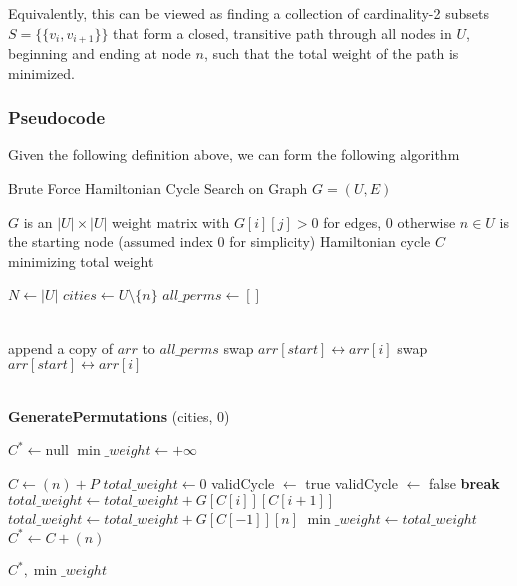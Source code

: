 Equivalently, this can be viewed as finding a collection of cardinality-2 subsets \( S = \{ \{v_i, v_{i+1}\} \} \) that form a closed, transitive path through all nodes in \( U \), beginning and ending at node \( n \), such that the total weight of the path is minimized.


\subsubsection{Pseudocode}
Given the following definition above, we can form the following algorithm

\begin{algorithm}[H]
    \caption{Brute Force Hamiltonian Cycle Search on Graph $G = (U, E)$}
    \begin{algorithmic}
    \Require{} $G$ is an $|U| \times |U|$ weight matrix with $G[i][j] > 0$ for edges, 0 otherwise
    \Require{} $n \in U$ is the starting node (assumed index 0 for simplicity)
    \Ensure{} Hamiltonian cycle $C$ minimizing total weight
    
    \State{} $N \gets |U|$
    \State{} $cities \gets U \setminus \{n\}$ 
    \State{} $all\_perms \gets []$
    
    \\
            \State{} append a copy of $arr$ to $all\_perms$
            \State{} \Return{}
        \EndIf{}
            \State{} swap $arr[start] \leftrightarrow arr[i]$
            \State{} 
            \State{} swap $arr[start] \leftrightarrow arr[i]$ 
        \EndFor{}
    \EndProcedure{}
    
    \\
    \State{} \textbf{GeneratePermutations} (cities, 0)
    
    \State{} $C^{*} \gets \text{null}$
    \State{} $\min\_weight \gets +\infty$
    
        \State{} $C \gets (n) + P$ 
        \State{} $total\_weight \gets 0$
        \State{} validCycle $\gets$ true
             
                \State{} validCycle $\gets$ false
                \State{} \textbf{break}
            \Else{}
                \State{} $total\_weight \gets total\_weight + G[C[i]][C[i+1]]$
            \EndIf{}
        \EndFor{}
            \State{} $total\_weight \gets total\_weight + G[C[-1]][n]$ 
                \State{} $\min\_weight \gets total\_weight$
                \State{} $C^{*} \gets C + (n)$ 
            \EndIf{}
        \EndIf{}
    \EndFor{}
    
    \State{} \Return{} $C^{*}, \min\_weight$
    
    \end{algorithmic}
    \end{algorithm}

